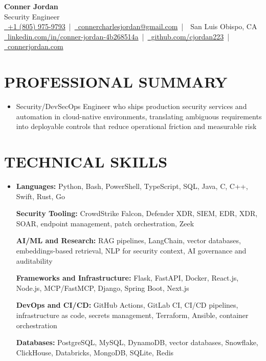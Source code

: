 \documentclass[letterpaper,10pt]{article}
\newcommand{\resumeSubHeadingListStart}{\begin{itemize}[leftmargin=0in,label={}]}
\newcommand{\resumeSubHeadingListEnd}{\end{itemize}}
\begin{document}
\begin{center}
  {\Huge \textbf{Conner Jordan}}\\[0pt]
  {\Large Security Engineer}\\[0pt]
  \href{tel:+18059759793}{\faPhone\ +1 (805) 975-9793} \,|\, 
  \href{mailto:connercharlesjordan@gmail.com}{\faEnvelope\ connercharlesjordan@gmail.com} \,|\, 
  \faMapMarker\ San Luis Obispo, CA \\[-2pt]
  \href{https://www.linkedin.com/in/conner-jordan-4b268514a/}{\faLinkedin\ linkedin.com/in/conner-jordan-4b268514a}
  \,|\, \href{https://github.com/cjordan223}{\faGithub\ github.com/cjordan223}
  \,|\, \href{https://connerjordan.com/}{\faGlobe\ connerjordan.com}
\end{center}

\vspace{4pt}

\section{PROFESSIONAL SUMMARY}
\vspace{8pt}
\resumeSubHeadingListStart
\item {\small
Security/DevSecOps Engineer who ships production security services and automation in cloud-native environments, translating ambiguous requirements into deployable controls that reduce operational friction and measurable risk}
\resumeSubHeadingListEnd
\vspace{6pt}

\section{TECHNICAL SKILLS}
\vspace{6pt}
\resumeSubHeadingListStart
\item {\small
\textbf{Languages:} Python, Bash, PowerShell, TypeScript, SQL, Java, C, C++, Swift, Rust, Go

\vspace{3pt}
\textbf{Security Tooling:} CrowdStrike Falcon, Defender XDR, SIEM, EDR, XDR, SOAR, endpoint management, patch orchestration, Zeek

\vspace{3pt}
\textbf{AI/ML and Research:} RAG pipelines, LangChain, vector databases, embeddings-based retrieval, NLP for security context, AI governance and auditability

\vspace{3pt}
\textbf{Frameworks and Infrastructure:} Flask, FastAPI, Docker, React.js, Node.js, MCP/FastMCP, Django, Spring Boot, Next.js

\vspace{3pt}
\textbf{DevOps and CI/CD:} GitHub Actions, GitLab CI, CI/CD pipelines, infrastructure as code, secrets management, Terraform, Ansible, container orchestration

\vspace{3pt}
\textbf{Databases:} PostgreSQL, MySQL, DynamoDB, vector databases, Snowflake, ClickHouse, Databricks, MongoDB, SQLite, Redis
}
\resumeSubHeadingListEnd
\vspace{6pt}
\end{document}
